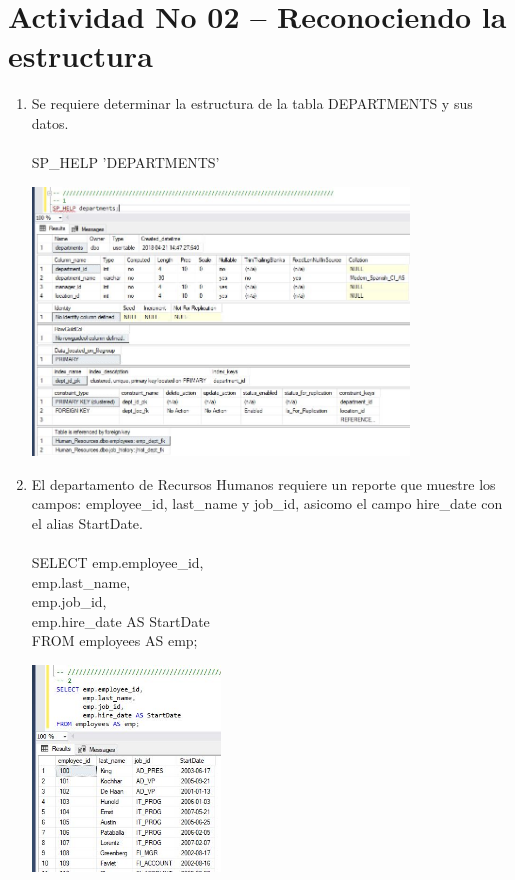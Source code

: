 \section{Actividad No 02 – Reconociendo la estructura} 

\begin{enumerate}[1.]
	\item Se requiere determinar la estructura de la tabla DEPARTMENTS y sus datos.
	\\
	\\SP\_HELP 'DEPARTMENTS'

	\begin{center}
	\includegraphics[width=10cm]{./Imagenes/actividad0201} 
	\end{center}

	\item El departamento de Recursos Humanos requiere un reporte que muestre los campos: employee\_id, last\_name y job\_id, asicomo el campo hire\_date con el alias StartDate.
	\\
	\\SELECT emp.employee\_id, \\
	emp.last\_name, \\
	emp.job\_id, \\
	emp.hire\_date AS StartDate \\
	FROM employees AS emp; \\
	\begin{center}
	\includegraphics[width=5cm]{./Imagenes/actividad0202} 
	\end{center}


\end{enumerate}
